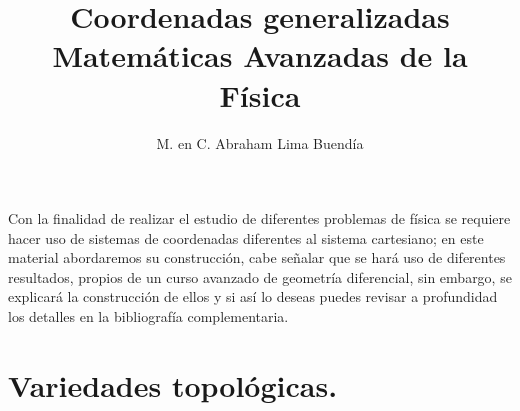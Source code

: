\documentclass[12pt]{article}
\title{Coordenadas generalizadas\\ \large{Matemáticas Avanzadas de la Física}\vspace{-3ex}}
\author{M. en C. Abraham Lima Buendía}
\date{ }
\begin{document}
\vspace{-4cm}
\maketitle
\fontsize{14}{14}\selectfont
Con la finalidad de realizar el estudio de diferentes problemas de física se requiere hacer uso de sistemas de coordenadas diferentes al sistema cartesiano; en este material abordaremos su construcción, cabe señalar que se hará uso de diferentes resultados, propios de un curso avanzado de geometría diferencial, sin  embargo, se explicará la construcción de ellos y si así lo deseas puedes revisar a profundidad los detalles en la bibliografía complementaria.
\section{Variedades topológicas.}
\end{document}
